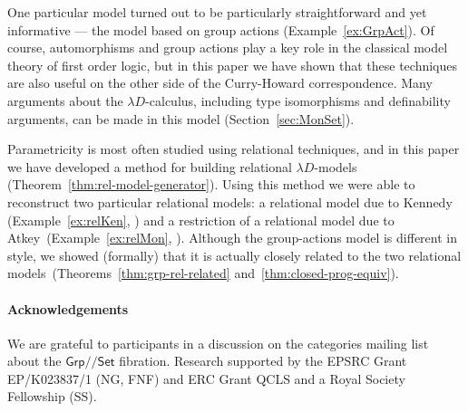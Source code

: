 \documentclass[a4paper,UKenglish]{lipics}
\theoremstyle{plain}
\newcommand{\msf}[1]{\mathsf{#1}} %
\newcommand{\Grp}{\msf{Grp}}
\newcommand{\Set}{\msf{Set}}
\newcommand{\Lslice}[1]{#1/\!/\Set}
\newcommand{\GrpSet}{\Lslice{\Grp}}
\begin{document}
One particular model turned out to be particularly straightforward and yet informative --- the model based on group actions (Example~\ref{ex:GrpAct}). Of course, automorphisms and group actions play a key role in the classical model theory of first order logic, but in this paper we have shown that these techniques are also useful on the other side of the Curry-Howard correspondence. Many arguments about the $\lambda D$-calculus, including type isomorphisms and definability arguments, can be made in this model (Section~\ref{sec:MonSet}).

Parametricity is most often studied using relational techniques, and in this paper we have developed a method for building relational $\lambda D$-models (Theorem~\ref{thm:rel-model-generator}). Using this method we were able to reconstruct two particular relational models: a relational model due to Kennedy (Example~\ref{ex:relKen}, \cite{Kennedy:1997:RPU:263699.263761}) and a restriction of a relational model due to Atkey~(Example~\ref{ex:relMon}, \cite{atkey14conservation}). Although the group-actions model is different in style, we showed (formally) that it is actually closely related to the two relational models~(Theorems~\ref{thm:grp-rel-related} and~\ref{thm:closed-prog-equiv}).


\paragraph*{Acknowledgements}
We are grateful to participants in a discussion on the categories
mailing list about the $\GrpSet$ fibration.  Research supported by the EPSRC Grant EP/K023837/1 (NG, FNF) and ERC
Grant QCLS and a Royal Society Fellowship (SS).


\end{document}
